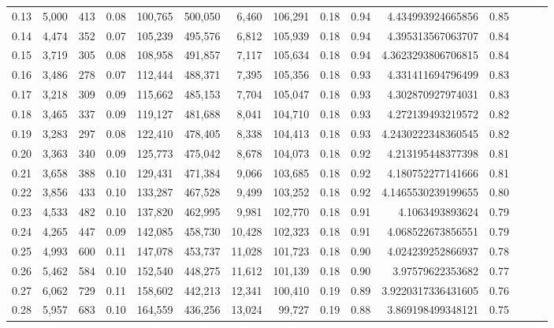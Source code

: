 \begin{tabular}{rrrrrrrrrrrrrrr}
0.13 &   5,000 &    413 &  0.08 &  100,765 &  500,050 &    6,460 &  106,291 &  0.18 &  0.94 &     4.434993924665856 &      0.85 \\
0.14 &   4,474 &    352 &  0.07 &  105,239 &  495,576 &    6,812 &  105,939 &  0.18 &  0.94 &     4.395313567063707 &      0.84 \\
0.15 &   3,719 &    305 &  0.08 &  108,958 &  491,857 &    7,117 &  105,634 &  0.18 &  0.94 &    4.3623293806706815 &      0.84 \\
0.16 &   3,486 &    278 &  0.07 &  112,444 &  488,371 &    7,395 &  105,356 &  0.18 &  0.93 &     4.331411694796499 &      0.83 \\
0.17 &   3,218 &    309 &  0.09 &  115,662 &  485,153 &    7,704 &  105,047 &  0.18 &  0.93 &     4.302870927974031 &      0.83 \\
0.18 &   3,465 &    337 &  0.09 &  119,127 &  481,688 &    8,041 &  104,710 &  0.18 &  0.93 &     4.272139493219572 &      0.82 \\
0.19 &   3,283 &    297 &  0.08 &  122,410 &  478,405 &    8,338 &  104,413 &  0.18 &  0.93 &    4.2430222348360545 &      0.82 \\
0.20 &   3,363 &    340 &  0.09 &  125,773 &  475,042 &    8,678 &  104,073 &  0.18 &  0.92 &     4.213195448377398 &      0.81 \\
0.21 &   3,658 &    388 &  0.10 &  129,431 &  471,384 &    9,066 &  103,685 &  0.18 &  0.92 &     4.180752277141666 &      0.81 \\
0.22 &   3,856 &    433 &  0.10 &  133,287 &  467,528 &    9,499 &  103,252 &  0.18 &  0.92 &    4.1465530239199655 &      0.80 \\
0.23 &   4,533 &    482 &  0.10 &  137,820 &  462,995 &    9,981 &  102,770 &  0.18 &  0.91 &       4.1063493893624 &      0.79 \\
0.24 &   4,265 &    447 &  0.09 &  142,085 &  458,730 &   10,428 &  102,323 &  0.18 &  0.91 &     4.068522673856551 &      0.79 \\
0.25 &   4,993 &    600 &  0.11 &  147,078 &  453,737 &   11,028 &  101,723 &  0.18 &  0.90 &     4.024239252866937 &      0.78 \\
0.26 &   5,462 &    584 &  0.10 &  152,540 &  448,275 &   11,612 &  101,139 &  0.18 &  0.90 &      3.97579622353682 &      0.77 \\
0.27 &   6,062 &    729 &  0.11 &  158,602 &  442,213 &   12,341 &  100,410 &  0.19 &  0.89 &    3.9220317336431605 &      0.76 \\
0.28 &   5,957 &    683 &  0.10 &  164,559 &  436,256 &   13,024 &   99,727 &  0.19 &  0.88 &     3.869198499348121 &      0.75 \\

\end{tabular}
